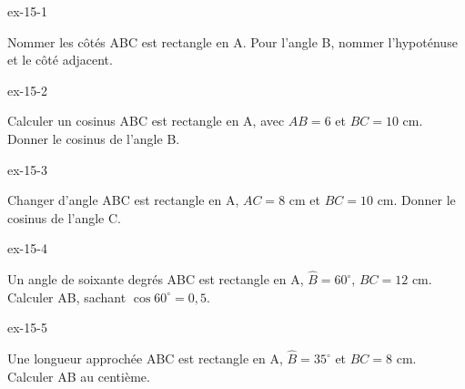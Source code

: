 \clearpage{}
\begin{blocLivre}{ex-15-1}\begin{exercice}[1]{Nommer les côtés}
ABC est rectangle en A. Pour l’angle B, nommer l’hypoténuse et le côté adjacent.
\label{fig-ex-15-1}
\end{exercice}\end{blocLivre}
\begin{blocLivre}{ex-15-2}\begin{exercice}[1]{Calculer un cosinus}
ABC est rectangle en A, avec $AB=6$ et $BC=10$ cm. Donner le cosinus de l’angle B.
\label{fig-ex-15-2}
\end{exercice}\end{blocLivre}
\begin{blocLivre}{ex-15-3}\begin{exercice}[1]{Changer d’angle}
ABC est rectangle en A, $AC=8$ cm et $BC=10$ cm. Donner le cosinus de l’angle C.
\label{fig-ex-15-3}
\end{exercice}\end{blocLivre}
\begin{blocLivre}{ex-15-4}\begin{exercice}[1]{Un angle de soixante degrés}
ABC est rectangle en A, $\widehat B=60^\circ$, $BC=12$ cm. Calculer AB, sachant $\cos60^\circ=0{,}5$.
\label{fig-ex-15-4}
\end{exercice}\end{blocLivre}
\begin{blocLivre}{ex-15-5}\begin{exercice}[1]{Une longueur approchée}
ABC est rectangle en A, $\widehat B=35^\circ$ et $BC=8$ cm. Calculer AB au centième.
\label{fig-ex-15-5}
\end{exercice}\end{blocLivre}

